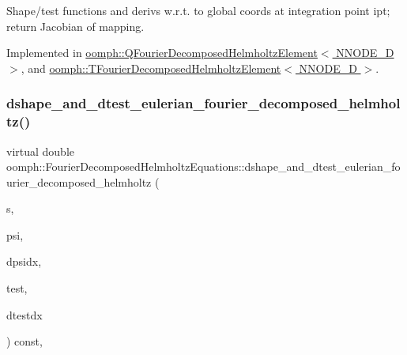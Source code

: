 Shape/test functions and derivs w.\+r.\+t. to global coords at integration point ipt; return Jacobian of mapping. 



Implemented in \hyperlink{classoomph_1_1QFourierDecomposedHelmholtzElement_a93414259c6dac210e2dc3064bf67c1e4}{oomph\+::\+Q\+Fourier\+Decomposed\+Helmholtz\+Element$<$ N\+N\+O\+D\+E\+\_\+D $>$}, and \hyperlink{classoomph_1_1TFourierDecomposedHelmholtzElement_a4bb917f49d4c15773f62583976b6d0de}{oomph\+::\+T\+Fourier\+Decomposed\+Helmholtz\+Element$<$ N\+N\+O\+D\+E\+\_\+D $>$}.

\mbox{\label{classoomph_1_1FourierDecomposedHelmholtzEquations_a9a0a3a0452e40681fbe610bb7a797252}} 
\subsubsection{\texorpdfstring{dshape\+\_\+and\+\_\+dtest\+\_\+eulerian\+\_\+fourier\+\_\+decomposed\+\_\+helmholtz()}{dshape\_and\_dtest\_eulerian\_fourier\_decomposed\_helmholtz()}}
{\footnotesize\ttfamily virtual double oomph\+::\+Fourier\+Decomposed\+Helmholtz\+Equations\+::dshape\+\_\+and\+\_\+dtest\+\_\+eulerian\+\_\+fourier\+\_\+decomposed\+\_\+helmholtz (\begin{DoxyParamCaption}\item[{const \hyperlink{classoomph_1_1Vector}{Vector}$<$ double $>$ \&}]{s,  }\item[{\hyperlink{classoomph_1_1Shape}{Shape} \&}]{psi,  }\item[{\hyperlink{classoomph_1_1DShape}{D\+Shape} \&}]{dpsidx,  }\item[{\hyperlink{classoomph_1_1Shape}{Shape} \&}]{test,  }\item[{\hyperlink{classoomph_1_1DShape}{D\+Shape} \&}]{dtestdx }\end{DoxyParamCaption}) const\hspace{0.3cm}{\ttfamily [protected]}, {}}



